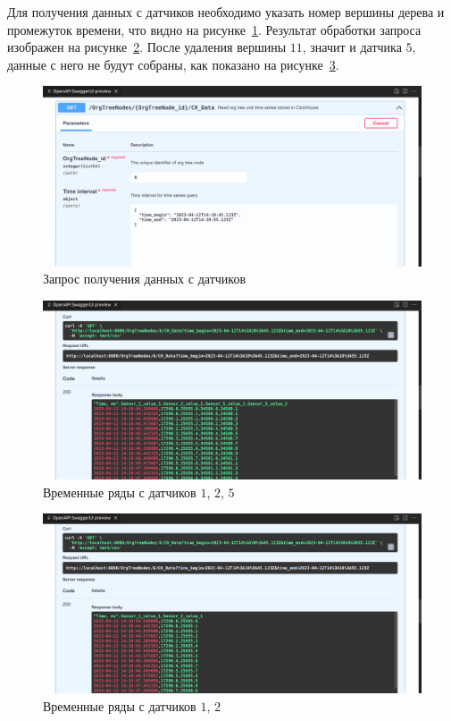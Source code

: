 Для получения данных с датчиков необходимо указать номер вершины дерева и промежуток времени, что видно на рисунке~\ref{swagger7}. Результат обработки запроса изображен на рисунке~\ref{swagger8}. После удаления вершины $11$, значит и датчика $5$, данные с него не будут собраны, как показано на рисунке~\ref{swagger9}.

\begin{figure}
    \includegraphics[scale=0.2]{../img/swagger7.png}
    \caption{Запрос получения данных с датчиков}
    \label{swagger7}
\end{figure}

\begin{figure}
    \includegraphics[scale=0.2]{../img/swagger8.png}
    \caption{Временные ряды с датчиков $1$, $2$, $5$}
    \label{swagger8}
\end{figure}

\begin{figure}
    \includegraphics[scale=0.2]{../img/swagger9.png}
    \caption{Временные ряды с датчиков $1$, $2$}
    \label{swagger9}
\end{figure}

